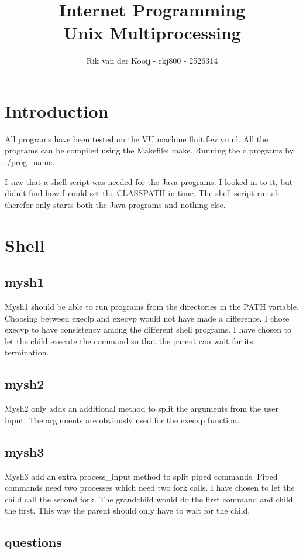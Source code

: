 \documentclass[10pt,a4paper]{article}
\title{Internet Programming\\Unix Multiprocessing}
\author{Rik van der Kooij - rkj800 - 2526314}
\begin{document}
\maketitle

\section{Introduction}
All programs have been tested on the VU machine fluit.few.vu.nl. All the programs can be compiled using the Makefile: make. Running the c programs by ./prog\_name.

I saw that a shell script was needed for the Java programs. I looked in to it, but didn't find how I could set the CLASSPATH in time. The shell script run.sh therefor only starts both the Java programs and nothing else.

\section{Shell}
\subsection{mysh1}
Mysh1 should be able to run programs from the directories in the PATH variable. Choosing between execlp and execvp would not have made a difference. I chose execvp to have consistency among the different shell programs. I have chosen to let the child execute the command so that the parent can wait for its termination.

\subsection{mysh2}
Mysh2 only adds an additional method to split the arguments from the user input. The arguments are obviously used for the execvp function.

\subsection{mysh3}
Mysh3 add an extra process\_input method to split piped commands. Piped commands need two processes which need two fork calls. I have chosen to let the child call the second fork. The grandchild would do the first command and child the first. This way the parent should only have to wait for the child.

\subsection{questions}
\end{document}
